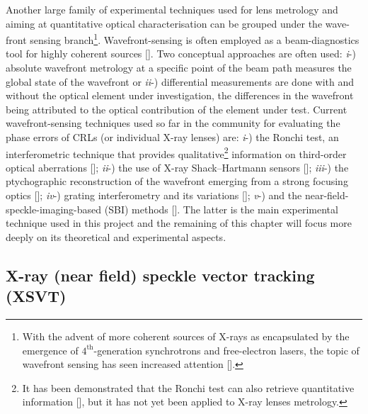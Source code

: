 \begin{refsection}
Another large family of experimental techniques used for lens metrology and aiming at quantitative optical characterisation can be grouped under the wave-front sensing branch\footnote{With the advent of more coherent sources of X-rays as encapsulated by the emergence of $4^{\text{th}}$-generation synchrotrons and free-electron lasers, the topic of wavefront sensing has seen increased attention [\cite{Seaberg2019}].}. Wavefront-sensing is often employed as a beam-diagnostics tool for highly coherent sources [\cite{Seaberg2019}]. Two conceptual approaches are often used: \textit{i}-) absolute wavefront metrology at a specific point of the beam path measures the global state of the wavefront or \textit{ii}-) differential measurements are done with and without the optical element under investigation, the differences in the wavefront being attributed to the optical contribution of the element under test. Current wavefront-sensing techniques used so far in the community for evaluating the phase errors of CRLs (or individual X-ray lenses) are: \textit{i}-) the Ronchi test, an interferometric technique that provides qualitative\footnote{It has been demonstrated that the Ronchi test can also retrieve quantitative information [\cite{Lee2010}], but it has not yet been applied to X-ray lenses metrology.} information on third-order optical aberrations [\cite{Nilsson2012, Uhlen2014}]; \textit{ii}-) the use of X-ray Shack–Hartmann sensors [\cite{Mayo2004, Mercere2005, Mikhaylov2020}]; \textit{iii}-) the ptychographic reconstruction of the wavefront emerging from a strong focusing optics [\cite{Schropp2013,Sala2017,Seiboth2017}]; \textit{iv}-) grating interferometry and its variations [\cite{David2012,Koch2016,Grizolli2017}]; \textit{v}-) and the near-field-speckle-imaging-based (SBI) methods [\cite{Berujon2013,Zdora2018,Berujon2020a}]. The latter is the main experimental technique used in this project and the remaining of this chapter will focus more deeply on its theoretical and experimental aspects.


\subsection{X-ray (near field) speckle vector tracking (XSVT)}\label{sec:XSVT}


\end{refsection}
